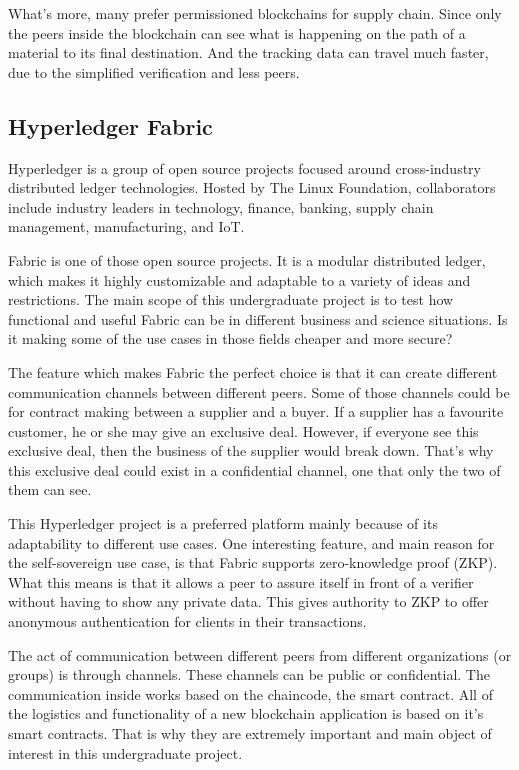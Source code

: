 \documentclass[a4paper,11pt]{report}
\begin{document}
What’s more, many prefer permissioned blockchains for supply chain. Since only the peers inside the blockchain can see what is happening on the path of a material to its final destination. And the tracking data can travel much faster, due to the simplified verification and less peers. 


\subsection{Hyperledger Fabric}
\label{hyperledgerFabric} 
Hyperledger is a group of open source projects focused around cross-industry distributed ledger technologies. Hosted by The Linux Foundation, collaborators include industry leaders in technology, finance, banking, supply chain management, manufacturing, and IoT.

	Fabric is one of those open source projects. It is a modular distributed ledger, which makes it highly customizable and adaptable to a variety of ideas and restrictions. The main scope of this undergraduate project is to test how functional and useful Fabric can be in different business and science situations. Is it making some of the use cases in those fields cheaper and more secure?
	
The feature which makes Fabric the perfect choice is that it can create different communication channels between different peers. Some of those channels could be for contract making between a supplier and a buyer. If a supplier has a favourite customer, he or she may give an exclusive deal. However, if everyone see this exclusive deal, then the business of the supplier would break down. That’s why this exclusive deal could exist in a confidential channel, one that only the two of them can see. 

	This Hyperledger project is a preferred platform mainly because of its adaptability to different use cases. One interesting feature, and main reason for the self-sovereign use case, is that Fabric supports zero-knowledge proof (ZKP). What this means is that it allows a peer to assure itself in front of a verifier without having to show any private data. This gives authority to ZKP to offer anonymous authentication for clients in their transactions. \cite{li2018fppb}
	
	The act of communication between different peers from different organizations (or groups) is through channels. These channels can be public or confidential. The communication inside works based on the chaincode, the smart contract. All of the logistics and functionality of a new blockchain application is based on it’s smart contracts. That is why they are extremely important and main object of interest in this undergraduate project. 
\end{document}
